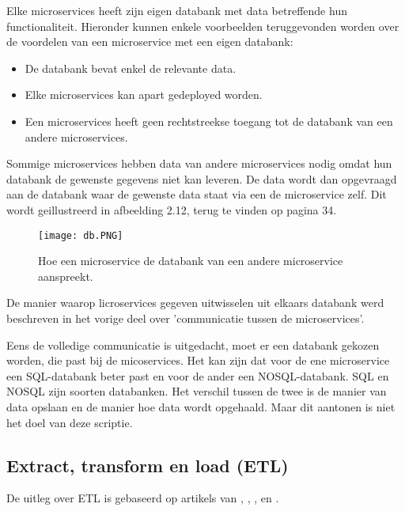 Elke microservices heeft zijn eigen databank met data betreffende hun functionaliteit. Hieronder kunnen enkele voorbeelden teruggevonden worden over de voordelen van een microservice met een eigen databank:
\begin{itemize}
	\item De databank bevat enkel de relevante data.
	\item Elke microservices kan apart gedeployed worden. 
	\item Een microservices heeft geen rechtstreekse toegang tot de databank van een andere microservices. 
\end{itemize}

Sommige microservices hebben data van andere microservices nodig omdat hun databank de gewenste gegevens niet kan leveren. De data wordt dan opgevraagd aan de databank waar de gewenste data staat via een de microservice zelf. Dit wordt geillustreerd in afbeelding 2.12, terug te vinden op pagina 34.
\begin{figure}[h!]
	\texttt{[image: db.PNG]}
	\centering
	\caption{Hoe een microservice de databank van een andere microservice aanspreekt.}
\end{figure}
 
De manier waarop licroservices gegeven uitwisselen uit elkaars databank werd beschreven in het vorige deel over 'communicatie tussen de microservices'.
 
Eens de volledige communicatie is uitgedacht, moet er een databank gekozen worden, die past bij de micoservices. Het kan zijn dat voor de ene microservice een SQL-databank beter past en voor de ander een NOSQL-databank. SQL en NOSQL zijn soorten databanken. Het verschil tussen de twee is de manier van data opslaan en de manier hoe data wordt opgehaald. Maar dit aantonen is niet het doel van deze scriptie.
 
\subsection{Extract, transform en load (ETL)}
De uitleg over ETL is gebaseerd op artikels van \textcite{Loshin2019}, \textcite{Alley2018}, \textcite{Stich2019}, \textcite{Guru2019} en \textcite{Naveen2016}.

